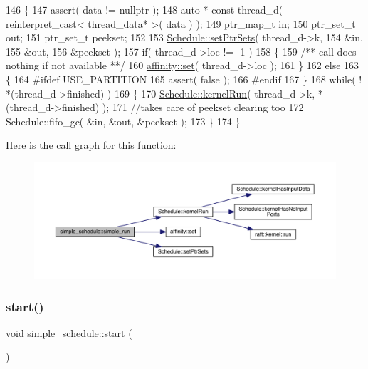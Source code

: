 \begin{DoxyCode}
146 \{
147    assert( data != \textcolor{keyword}{nullptr} );
148    \textcolor{keyword}{auto} * \textcolor{keyword}{const} thread\_d( reinterpret\_cast< thread\_data* >( data ) );
149    ptr\_map\_t in;
150    ptr\_set\_t out;
151    ptr\_set\_t peekset;
152 
153    \hyperlink{class_schedule_aefaf185cc7d1f424cef7b23d8f679d47}{Schedule::setPtrSets}( thread\_d->k, 
154                         &in, 
155                         &out,
156                         &peekset );
157    \textcolor{keywordflow}{if}( thread\_d->loc != -1 )
158    \{\textcolor{comment}{}
159 \textcolor{comment}{      /** call does nothing if not available **/}
160       \hyperlink{structaffinity_abe34f20b4d661e9ed44ca5def0470e00}{affinity::set}( thread\_d->loc );
161    \}
162    \textcolor{keywordflow}{else}
163    \{
164 \textcolor{preprocessor}{#ifdef USE\_PARTITION}
165        assert( \textcolor{keyword}{false} );
166 \textcolor{preprocessor}{#endif}
167    \}
168    \textcolor{keywordflow}{while}( ! *(thread\_d->finished) )
169    \{
170       \hyperlink{class_schedule_acf28b4a4231e693585751a035873615c}{Schedule::kernelRun}( thread\_d->k, *(thread\_d->finished) );
171       \textcolor{comment}{//takes care of peekset clearing too}
172       Schedule::fifo\_gc( &in, &out, &peekset );
173    \}
174 \}
\end{DoxyCode}
Here is the call graph for this function\+:
\nopagebreak
\begin{figure}[H]
\begin{center}
\leavevmode
\includegraphics[width=350pt]{classsimple__schedule_a128caa6bacc62c7289bb09f234ef75b7_cgraph}
\end{center}
\end{figure}
\hypertarget{classsimple__schedule_ad60a7608111e011d0c04f6ac566cfd8c}{}\label{classsimple__schedule_ad60a7608111e011d0c04f6ac566cfd8c} 
\subsubsection{\texorpdfstring{start()}{start()}}
{\footnotesize\ttfamily void simple\+\_\+schedule\+::start (\begin{DoxyParamCaption}{ }\end{DoxyParamCaption})\hspace{0.3cm}{\ttfamily [virtual]}}

